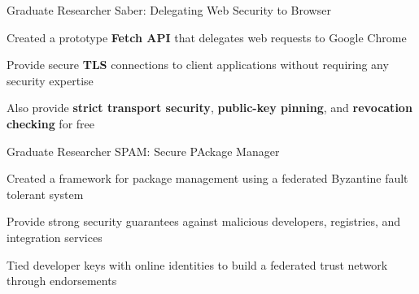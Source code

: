 


\begin{cventries}


\cventry
{Graduate Researcher} %
{Saber: Delegating Web Security to Browser} %
{} %
{} %
{ %
\begin{cvitems}
\item{Created a prototype \textbf{Fetch API} that delegates web requests to Google Chrome}
\item{Provide secure \textbf{TLS} connections to client applications without requiring any security expertise}
\item{Also provide \textbf{strict transport security}, \textbf{public-key pinning}, and \textbf{revocation checking} for free}
\end{cvitems}
}


\cventry
{Graduate Researcher} %
{SPAM: Secure PAckage Manager} %
{} %
{} %
{ %
\begin{cvitems}
\item{Created a framework for package management using a federated Byzantine fault tolerant system}
\item{Provide strong security guarantees against malicious developers, registries, and integration services}
\item{Tied developer keys with online identities to build a federated trust network through endorsements}
\end{cvitems}
}



\end{cventries}
